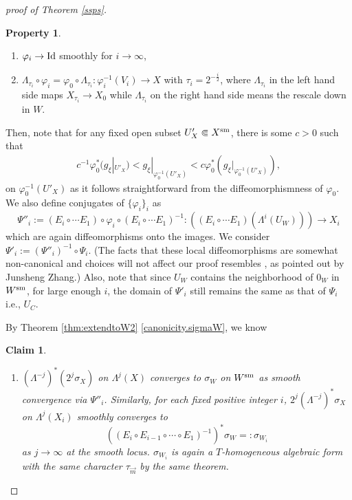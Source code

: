 \documentclass[12pt,a4paper]{amsart}
\newtheorem{Claim}[Thm]{Claim}
\theoremstyle{remark}
\theoremstyle{definition}
\newtheorem{Property}{Property}
\begin{document}
\begin{proof}[proof of Theorem \ref{ssps}]
\begin{Property}\label{varphi.property}
\begin{enumerate}
\item $\varphi_i\to {\rm Id}$ smoothly for $i\to \infty$,   
\item \label{commute}
$\Lambda_{\tau_i}\circ \varphi_i=\varphi_0\circ \Lambda_{\tau_i}\colon \varphi_i^{-1}(V_i)\to X$ 
with $\tau_i=2^{-\frac{i}{2}}$, 
where $\Lambda_{\tau_i}$ in the left hand side  maps 
$X_{\tau_i}\to X_0$ while $\Lambda_{\tau_i}$ on the right hand side means the rescale down in $W$. 
\end{enumerate}
\end{Property}
Then, note that 
for any fixed open subset $U'_X\Subset X^{\rm sm}$, 
there is some $c>0$ such that 
\begin{align}\label{almostisometry}
c^{-1}%
\varphi_0^* (g_\xi|_{U'_X})
<g_\xi|_{\varphi_0^{-1}(U'_X)}
<c%
\varphi_0^* (g_\xi|_{\varphi_0^{-1}(U'_X)}), 
\end{align}
on $\varphi_0^{-1}(U'_X)$ 
as it follows straightforward from the 
diffeomorphismness of $\varphi_0$. 
We also define conjugates of $\{\varphi_i\}_i$ as 
$$\Psi''_i:=(E_i\circ\cdots E_1)\circ \varphi_i \circ(E_i\circ\cdots E_1)^{-1}\colon ((E_i\circ\cdots E_1)(\Lambda^i(U_W)))\to X_i$$ 
which are again diffeomorphisms 
onto the images. We consider 
$\Psi'_i :=(\Psi''_i)^{-1}\circ \Psi_i$. 
(The facts that these local diffeomorphisms are somewhat non-canonical and 
choices will not affect our proof resembles \cite[Lemma 3.9]{HS}, as 
pointed out by Junsheng Zhang.) 
Also, note that 
since $U_W$ contains the neighborhood of $0_W$ in $W^{\rm sm}$, 
for large enough $i$, the domain of $\Psi'_i$ 
still remains the same as that of $\Psi_i$ i.e., $U_C$. 

By Theorem \ref{thm:extendtoW2} 
\eqref{canonicity.sigmaW}, we know 
\begin{Claim}\label{sigmaconv2}
\begin{enumerate}
\item \label{simgaconv2.1}
$(\Lambda^{-j})^* (2^j\sigma_X)$ on $\Lambda^j(X)$ converges to 
$\sigma_W$ on $W^{\rm sm}$ as smooth convergence via $\Psi''_i$. Similarly, for each fixed positive integer $i$, 
$2^j (\Lambda^{-j})^* \sigma_X$ on $\Lambda^j (X_i)$ smoothly converges to 
$$((E_i\circ E_{i-1}\circ \cdots \circ E_1)^{-1})^* \sigma_W=:\sigma_{W_i}$$ 
as $j\to \infty$ at the smooth locus. 
$\sigma_{W_i}$ is again a $T$-homogeneous 
algebraic form with the same character $\tau_{\vec{m}}$ by the same theorem. 


\end{enumerate}
\end{Claim}
\end{proof}
\end{document}
